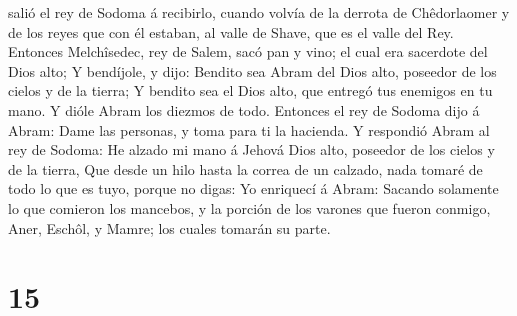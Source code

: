 salió el rey de Sodoma á recibirlo, cuando volvía de la derrota de
Chêdorlaomer y de los reyes que con él estaban, al valle de Shave, que
es el valle del Rey.  Entonces Melchîsedec, rey de Salem,
sacó pan y vino; el cual era sacerdote del Dios alto;  Y
bendíjole, y dijo: Bendito sea Abram del Dios alto, poseedor de los
cielos y de la tierra;  Y bendito sea el Dios alto, que
entregó tus enemigos en tu mano. Y dióle Abram los diezmos de todo.
 Entonces el rey de Sodoma dijo á Abram: Dame las
personas, y toma para ti la hacienda.  Y respondió Abram
al rey de Sodoma: He alzado mi mano á Jehová Dios alto, poseedor de los
cielos y de la tierra,  Que desde un hilo hasta la correa
de un calzado, nada tomaré de todo lo que es tuyo, porque no digas: Yo
enriquecí á Abram:  Sacando solamente lo que comieron los
mancebos, y la porción de los varones que fueron conmigo, Aner, Eschôl,
y Mamre; los cuales tomarán su parte.

\hypertarget{section-14}{%
\section{15}\label{section-14}}

